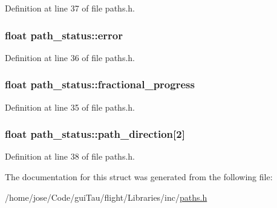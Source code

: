 Definition at line 37 of file paths.\-h.

\hypertarget{structpath__status_a673ce13b12050e471c15f386e8193ac7}{
\subsubsection[{error}]{\setlength{\rightskip}{0pt plus 5cm}float path\-\_\-status\-::error}}\label{structpath__status_a673ce13b12050e471c15f386e8193ac7}


Definition at line 36 of file paths.\-h.

\hypertarget{structpath__status_a4ec0ce142eafe131f8e2d45d1771ebd3}{
\subsubsection[{fractional\-\_\-progress}]{\setlength{\rightskip}{0pt plus 5cm}float path\-\_\-status\-::fractional\-\_\-progress}}\label{structpath__status_a4ec0ce142eafe131f8e2d45d1771ebd3}


Definition at line 35 of file paths.\-h.

\hypertarget{structpath__status_ac36e4cfed92a1fe959ba8f45728e4779}{
\subsubsection[{path\-\_\-direction}]{\setlength{\rightskip}{0pt plus 5cm}float path\-\_\-status\-::path\-\_\-direction\mbox{[}2\mbox{]}}}\label{structpath__status_ac36e4cfed92a1fe959ba8f45728e4779}


Definition at line 38 of file paths.\-h.



The documentation for this struct was generated from the following file\-:\begin{DoxyCompactItemize}
\item 
/home/jose/\-Code/gui\-Tau/flight/\-Libraries/inc/\hyperlink{paths_8h}{paths.\-h}\end{DoxyCompactItemize}
